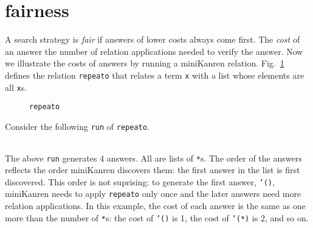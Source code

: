 \documentclass[format=acmlarge, review=true, authordraft=true]{acmart}
\begin{document}



\section{fairness}


A search strategy is \emph{fair} if answers of lower costs always come first. 
The \emph{cost} of an answer the number of relation applications needed to 
verify the answer. Now we illustrate the costs of answers by running a 
miniKanren relation. Fig.~\ref{def-repeato} defines the relation 
\texttt{repeato} that relates a term \texttt{x} with a list whose elements are 
all \texttt{x}s.


\begin{figure}
  
  \caption{\texttt{repeato}}
  \label{def-repeato}
\end{figure}

Consider the following \texttt{run} of \texttt{repeato}.
\begin{center}
  \begin{tabular}{c}
  
   \end{tabular}
\end{center}

The above \texttt{run} generates 4 answers. All are lists of \texttt{*}s.
The order of the answers reflects the order miniKanren discovers them:
the first answer in the list is first discovered. This order is not suprising:
to generate the first answer, \texttt{'()}, miniKanren needs to apply
\texttt{repeato} only once and the later answers need more relation
applications. In this example, the cost of each answer is the same as
one more than the number of \texttt{*}s: the cost of \texttt{'()} is 1,
the cost of \texttt{'(*)} is 2, and so on.
\end{document}
